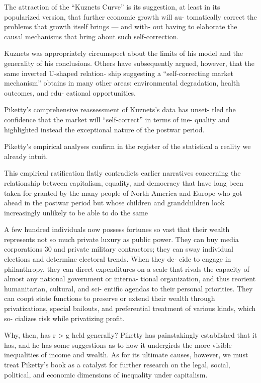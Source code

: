 \documentclass[
]{book}
\begin{document}
The attraction of the ``Kuznets Curve'' is its suggestion, at
least in its popularized version, that further economic growth will au-
tomatically correct the problems that growth itself brings --- and with-
out having to elaborate the causal mechanisms that bring about such
self-correction.

Kuznets was appropriately circumspect about the limits
of his model and the generality of his conclusions.
Others have subsequently argued, however, that the same inverted U-shaped relation-
ship suggesting a ``self-correcting market mechanism'' obtains in many
other areas: environmental degradation, health outcomes, and edu-
cational opportunities.

Piketty's comprehensive reassessment of Kuznets's data has unset-
tled the confidence that the market will ``self-correct'' in terms of ine-
quality and highlighted instead the exceptional nature of the postwar
period.

Piketty's empirical analyses confirm in the register of the statistical a
reality we already intuit.

This
empirical ratification flatly contradicts earlier narratives concerning
the relationship between capitalism, equality, and democracy that have
long been taken for granted by the many people of North America and
Europe who got ahead in the postwar period but whose children and
grandchildren look increasingly unlikely to be able to do the same

A few hundred individuals now possess fortunes so vast that their wealth
represents not so much private luxury as public power. They can buy
media corporations 30 and private military contractors; they can sway
individual elections and determine electoral trends. When they de-
cide to engage in philanthropy, they can direct expenditures on a scale
that rivals the capacity of almost any national government or interna-
tional organization, and thus reorient humanitarian, cultural, and sci-
entific agendas to their personal priorities. They can coopt state
functions to preserve or extend their wealth through privatizations,
special bailouts, and preferential treatment of various kinds, which so-
cializes risk while privatizing profit.

Why, then, has r \textgreater{} g held generally?
Piketty has painstakingly established that it has, and he has some
suggestions as to how it undergirds the more visible inequalities
of income and wealth.
As for its ultimate causes, however, we must treat Piketty's
book as a catalyst for further research on the legal, social, political,
and economic dimensions of inequality under capitalism.
\end{document}
